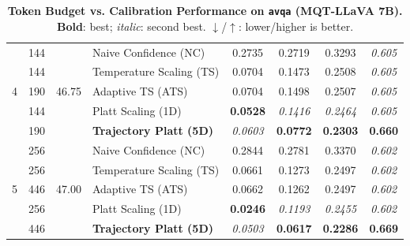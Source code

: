 \begin{table}[t]
\begin{tabular}{ccclcccc}
\midrule
\multirow{5}{*}{4} & 144 & \multirow{5}{*}{46.75} & Naive Confidence (NC) & 0.2735 & 0.2719 & 0.3293 & \textit{0.605} \\
 & 144 &  & Temperature Scaling (TS) & 0.0704 & 0.1473 & 0.2508 & \textit{0.605} \\
 & 190 &  & Adaptive TS (ATS) & 0.0704 & 0.1498 & 0.2507 & \textit{0.605} \\
 & 144 &  & Platt Scaling (1D) & \textbf{0.0528} & \textit{0.1416} & \textit{0.2464} & \textit{0.605} \\
 & 190 &  & \textbf{Trajectory Platt (5D)} & \textit{0.0603} & \textbf{0.0772} & \textbf{0.2303} & \textbf{0.660} \\
\midrule
\multirow{5}{*}{5} & 256 & \multirow{5}{*}{47.00} & Naive Confidence (NC) & 0.2844 & 0.2781 & 0.3370 & \textit{0.602} \\
 & 256 &  & Temperature Scaling (TS) & 0.0661 & 0.1273 & 0.2497 & \textit{0.602} \\
 & 446 &  & Adaptive TS (ATS) & 0.0662 & 0.1262 & 0.2497 & \textit{0.602} \\
 & 256 &  & Platt Scaling (1D) & \textbf{0.0246} & \textit{0.1193} & \textit{0.2455} & \textit{0.602} \\
 & 446 &  & \textbf{Trajectory Platt (5D)} & \textit{0.0503} & \textbf{0.0617} & \textbf{0.2286} & \textbf{0.669} \\
\bottomrule
\end{tabular}
\caption{\textbf{Token Budget vs. Calibration Performance on \texttt{avqa} (MQT-LLaVA 7B).} \textbf{Bold}: best; \textit{italic}: second best. $\downarrow$/$\uparrow$: lower/higher is better.}
\label{tab:token_budget_avqa_mqt}
\end{table}
